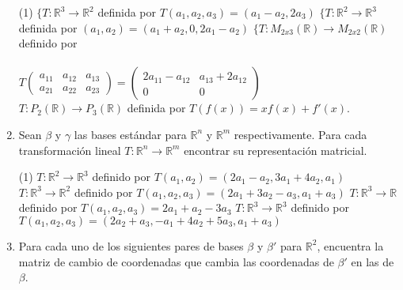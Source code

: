 \documentclass[letterpaper,11pt]{article}
\begin{document}
\begin{enumerate}
\begin{tasks}(1)
\task $\lbrace T: \mathbb{R}^{3} \longrightarrow \mathbb{R}^{2}$ definida por $T(a_{1},a_{2},a_{3}) = (a_{1} - a_{2}, 2a_{3})$
\task $\lbrace T: \mathbb{R}^{2} \longrightarrow \mathbb{R}^{3}$ definida por $(a_{1},a_{2}) = (a_{1} + a_{2}, 0, 2a_{1} - a_{2})$
\task $\lbrace T: M_{2x3}(\mathbb{R}) \longrightarrow M_{2x2}(\mathbb{R})$ definido por\\
\\
$T \begin{pmatrix} a_{11} & a_{12} & a_{13} \\ a_{21} & a_{22} & a_{23} \end{pmatrix} = \begin{pmatrix} 2a_{11} - a_{12} & a_{13} + 2a_{12} \\ 0 & 0 \end{pmatrix}$
\\
\task $T: P_{2}(\mathbb{R}) \longrightarrow P_{3}(\mathbb{R})$ definida por $T(f(x)) = xf(x) + f'(x)$.
\end{tasks}
 
\item Sean $\beta$ y $\gamma$ las bases estándar para $\mathbb{R}^{n}$ y $\mathbb{R}^{m}$ respectivamente. Para cada transformación lineal $T: \mathbb{R}^{n} \longrightarrow \mathbb{R}^{m}$ encontrar su representación matricial.
\begin{tasks}(1)
\task $T: \mathbb{R}^{2} \longrightarrow \mathbb{R}^{3}$ definido por $T(a_{1},a_{2}) = (2a_{1} - a_{2}, 3a_{1} + 4a_{2},a_{1})$
\task $T: \mathbb{R}^{3} \longrightarrow \mathbb{R}^{2}$ definido por $T(a_{1},a_{2},a_{3}) = (2a_{1} + 3a_{2} - a_{3}, a_{1} + a_{3})$
\task $T: \mathbb{R}^{3} \longrightarrow \mathbb{R}$ definido por $T(a_{1},a_{2},a_{3}) = 2a_{1} + a_{2} - 3a_{3}$
\task $T: \mathbb{R}^{3} \longrightarrow \mathbb{R}^{3}$ definido por $T(a_{1},a_{2},a_{3}) = (2a_{2} + a_{3}, -a_{1} + 4a_{2} + 5a_{3},a_{1} + a_{3})$
\end{tasks}

\newpage
\item Para cada uno de los siguientes pares de bases $\beta$ y $\beta'$ para $\mathbb{R}^{2}$, encuentra la matriz de cambio de coordenadas que cambia las coordenadas de $\beta'$ en las de $\beta$.


\end{enumerate}
\end{document}

